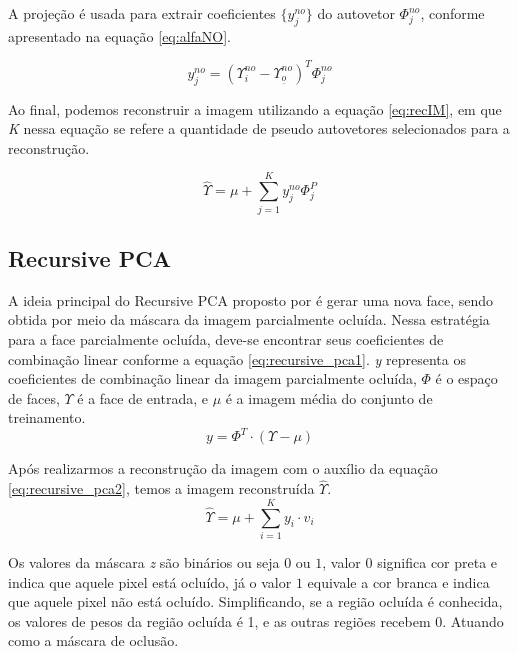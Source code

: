 A projeção é usada para extrair coeficientes $\{y_j^{no} \}$ do autovetor $\Phi _j^{no}$, conforme apresentado na equação \ref{eq:alfaNO}.

\begin{equation}
y_j^{no} = (\Upsilon_{i}^{no} - \Upsilon_{\underline{o}}^{no})^T \Phi _j^{no}
\label{eq:alfaNO}
\end{equation}

Ao final, podemos reconstruir a imagem utilizando a equação \ref{eq:recIM}, em que \textit{K} nessa equação se refere a quantidade de pseudo autovetores selecionados para a reconstrução.

\begin{equation}
\hat{\Upsilon} = \mu + \sum_{j=1}^{K}y_j^{no}\Phi_j^{P}
\label{eq:recIM}
\end{equation}




\subsection{Recursive PCA}
A ideia principal do Recursive PCA proposto por  é gerar uma nova face, sendo obtida por meio da máscara da imagem parcialmente ocluída. Nessa estratégia para a face parcialmente ocluída, deve-se encontrar seus coeficientes de combinação linear conforme a equação \ref{eq:recursive_pca1}. \textit{y} representa os coeficientes de combinação linear da imagem parcialmente ocluída, $\Phi$ é o espaço de faces, $\Upsilon$ é a face de entrada, e \textit{$\mu$} é a imagem média do conjunto de treinamento.
\begin{equation}
\label{eq:recursive_pca1}
y = \Phi^T \cdot (\Upsilon - \mu)
\end{equation}

Após realizarmos a reconstrução da imagem com o auxílio da equação \ref{eq:recursive_pca2}, temos a imagem reconstruída $\hat{\Upsilon}$.
\begin{equation}
\label{eq:recursive_pca2}
\hat{\Upsilon} = \mu  + \sum_{i=1}^{K}y_i \cdot v_i
\end{equation}

Os valores da máscara \textit{z} são binários ou seja $0$ ou $1$, valor $0$ significa cor preta e indica que aquele pixel está ocluído, já o valor $1$ equivale a cor branca e indica que aquele pixel não está ocluído. Simplificando, se a região ocluída é conhecida, os valores de pesos da região ocluída é 1, e as outras regiões recebem 0. Atuando como a máscara de oclusão.

